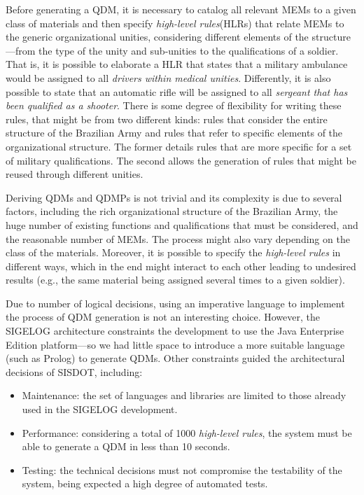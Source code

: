 \documentclass{bmcart}
\newcommand{\callers}{\emph{high-level rules}\xspace}
\newcommand{\shc}{HLR\xspace}
\begin{document}
Before generating a QDM, it is necessary to catalog all relevant MEMs to a given class of materials and then specify \callers (HLRs) that relate MEMs to the generic organizational unities, considering different elements of the structure---from the type of the unity and sub-unities to the qualifications of a soldier. That is, it is possible to elaborate a \shc that states that a military ambulance would be assigned to all \emph{drivers within medical unities}. Differently, it is also possible to state that an automatic rifle will be assigned to all \emph{sergeant that has been qualified as a shooter}. There is some degree of flexibility for writing these rules, that might be from two different kinds: rules that consider the entire structure of the Brazilian Army and rules that refer to specific elements of the organizational structure. The former details rules that are more specific for a set of military qualifications. The second allows the generation of rules that might be reused through different unities. 

Deriving QDMs and QDMPs is not trivial and its complexity is due to several factors, including the rich organizational structure of the Brazilian Army, the huge number of existing functions and qualifications that must be considered, and the reasonable number of MEMs. The process might also vary depending on the class of the materials. Moreover, it is possible to specify the \callers in different ways, which in the end might interact to each other leading to undesired results (e.g., the same material being assigned several times to a given soldier). 

Due to number of logical decisions, using an imperative language to implement the process of QDM generation 
is not an interesting choice. However, the SIGELOG architecture constraints the development to use the Java Enterprise Edition platform---so we had little space to introduce a more suitable language (such as Prolog) to generate QDMs. Other constraints guided the architectural decisions of SISDOT, including:  

\begin{itemize}
	\item Maintenance: the set of languages and libraries are limited to those already used in the SIGELOG development.  
	\item Performance: considering a total of 1000 \callers, the system must be able to generate a QDM in less than 10 seconds.
	\item Testing: the technical decisions must not compromise the testability of the system, being expected a high degree of automated tests. 
\end{itemize}
\end{document}

